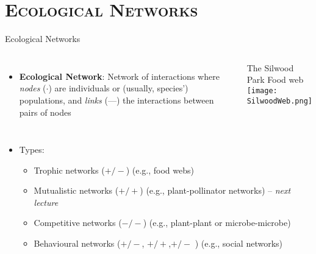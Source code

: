 \section{\scshape Ecological Networks}

\begin{frame}{Ecological Networks}

\begin{columns}[c]
  \begin{itemize}[<+->]\setlength{\itemindent}{0em} \itemsep6pt
    \item {\bf Ecological Network}: Network of interactions where {\it nodes} ($\boldsymbol{\cdot}$) are individuals or (usually, species') populations, and {\it links} (---) the interactions between pairs of nodes 
  \end{itemize}
  \centering
  {\footnotesize The Silwood Park Food web}\\
  \vspace{3pt}
  \texttt{[image: SilwoodWeb.png]}
\end{columns}
\pause 
\vspace{6pt}
\begin{itemize} \setlength{\itemindent}{-1em}
  \item Types:
  \begin{itemize}\setlength{\itemindent}{-2em}
  \item Trophic networks ($+/-$) (e.g., food webs)
  \item Mutualistic networks ($+/+$) (e.g., plant-pollinator networks) -- {\it next lecture}    
  \item Competitive networks ($-/-$) (e.g., plant-plant or microbe-microbe)
  \item Behavioural networks ($+/-$, $+/+$,$+/-$ ) (e.g., social networks)
 \end{itemize} 
\end{itemize}

\end{frame}

